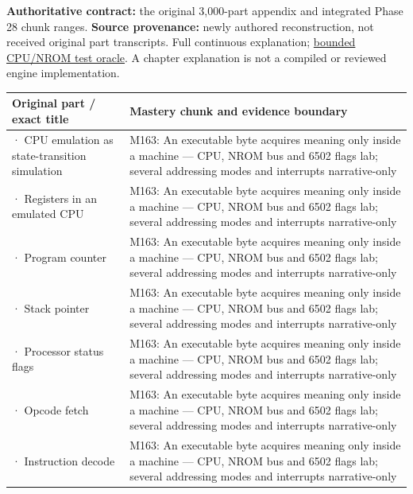 \textbf{Authoritative contract:} the original 3,000-part appendix and integrated Phase 28 chunk ranges. \textbf{Source provenance:} newly authored reconstruction, not received original part transcripts. {Full continuous explanation}; \hyperref[source-file-552a9e2296dc984412c8f06d]{bounded CPU/NROM test oracle}. A chapter explanation is not a compiled or reviewed engine implementation.

{\def\LTcaptype{none} %
\begin{longtable}[]{@{}
  >{\raggedright\arraybackslash}p{}
  >{\raggedright\arraybackslash}p{}@{}}
\toprule\noalign{}
\begin{minipage}[b]{\linewidth}\raggedright
Original part / exact title
\end{minipage} & \begin{minipage}[b]{\linewidth}\raggedright
Mastery chunk and evidence boundary
\end{minipage} \\
\midrule\noalign{}
\endhead
\bottomrule\noalign{}
\endlastfoot
2701 · CPU emulation as state-transition simulation & M163: An executable byte acquires meaning only inside a machine --- CPU, NROM bus and 6502 flags lab; several addressing modes and interrupts narrative-only \\
2702 · Registers in an emulated CPU & M163: An executable byte acquires meaning only inside a machine --- CPU, NROM bus and 6502 flags lab; several addressing modes and interrupts narrative-only \\
2703 · Program counter & M163: An executable byte acquires meaning only inside a machine --- CPU, NROM bus and 6502 flags lab; several addressing modes and interrupts narrative-only \\
2704 · Stack pointer & M163: An executable byte acquires meaning only inside a machine --- CPU, NROM bus and 6502 flags lab; several addressing modes and interrupts narrative-only \\
2705 · Processor status flags & M163: An executable byte acquires meaning only inside a machine --- CPU, NROM bus and 6502 flags lab; several addressing modes and interrupts narrative-only \\
2706 · Opcode fetch & M163: An executable byte acquires meaning only inside a machine --- CPU, NROM bus and 6502 flags lab; several addressing modes and interrupts narrative-only \\
2707 · Instruction decode & M163: An executable byte acquires meaning only inside a machine --- CPU, NROM bus and 6502 flags lab; several addressing modes and interrupts narrative-only \\

\end{longtable}}
